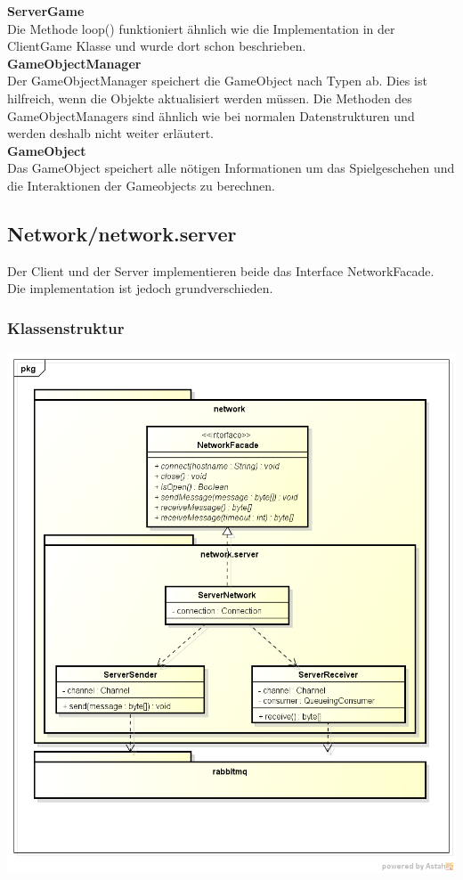 \documentclass[11pt]{scrartcl}
\begin{document}
\textbf{ServerGame}\\
Die Methode loop() funktioniert ähnlich wie die Implementation in der ClientGame Klasse und wurde dort schon beschrieben.\\

\textbf{GameObjectManager}\\
Der GameObjectManager speichert die GameObject nach Typen ab. Dies ist hilfreich, wenn die Objekte aktualisiert werden müssen. Die Methoden des GameObjectManagers sind ähnlich wie bei normalen Datenstrukturen und werden deshalb nicht weiter erläutert.\\

\textbf{GameObject}\\
Das GameObject speichert alle nötigen Informationen um das Spielgeschehen und die Interaktionen der Gameobjects zu berechnen.

\newpage

\subsection{Network/network.server}

Der Client und der Server implementieren beide das Interface NetworkFacade. Die implementation ist jedoch grundverschieden.

\subsubsection{Klassenstruktur}
\includegraphics[scale=0.5]{ClassDiagramNetworkServer}
\end{document}
